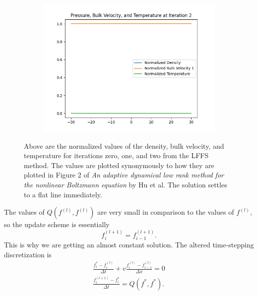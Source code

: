 \documentclass{article}
\begin{document}
\begin{figure}[H]
    \vspace{1em} %
    
    \begin{subfigure}[b]{0.45\textwidth}
    \includegraphics[width=\textwidth]{imgs/lax_friedrichs/iter2.png}
    \end{subfigure}
    
    \caption{Above are the normalized values of the density, bulk velocity, and temperature for iterations zero, one, and two from the LFFS method. The values are plotted synonymously to how they are plotted in Figure 2 of \textit{An adaptive dynamical low rank method for the nonlinear Boltzmann equation} by Hu et al. The solution settles to a flat line immediately.}
\end{figure}
The values of $Q(f^{(l)}, f^{(l)})$ are very small in comparison to the values of $f^{(l)}$, so the update scheme is essentially
\[
    f_i^{(l+1)} = f_{i-1}^{(l+1)}.
\]
This is why we are getting an almost constant solution.
The altered time-stepping discretization is 
\begin{gather*}
    \frac{f_i^* - f_i^{(l)}}{\Delta t} + v \frac{f_i^{(l)} - f_{i-1}^{(l)}}{\Delta x} = 0\\
    \frac{f_i^{(l+1)} - f^*_i}{\Delta t} = Q(f^*,f^*).
\end{gather*}
\end{document}
